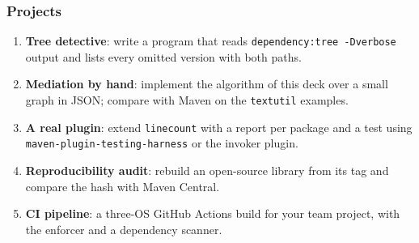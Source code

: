 \documentclass[aspectratio=169,10pt,compress]{beamer}
\begin{document}
\begin{frame}[t,fragile] \frametitle{Projects}
  \begin{enumerate}\small
    \item \textbf{Tree detective}: write a program that reads \texttt{dependency:tree -Dverbose} output and lists every omitted version with both paths.
    \item \textbf{Mediation by hand}: implement the algorithm of this deck over a small graph in JSON; compare with Maven on the \texttt{textutil} examples.
    \item \textbf{A real plugin}: extend \texttt{linecount} with a report per package and a test using \texttt{maven-plugin-testing-harness} or the invoker plugin.
    \item \textbf{Reproducibility audit}: rebuild an open-source library from its tag and compare the hash with Maven Central.
    \item \textbf{CI pipeline}: a three-OS GitHub Actions build for your team project, with the enforcer and a dependency scanner.
  \end{enumerate}
\end{frame}




\begin{frame}[t,fragile]
	\begin{center}
		\vspace{4cm}
	\end{center}
\end{frame}
\end{document}
